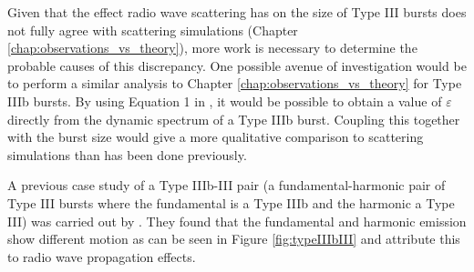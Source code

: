 %
%
Given that the effect radio wave scattering has on the size of Type III bursts does not fully agree with scattering simulations (Chapter \ref{chap:observations_vs_theory}), more work is necessary to determine the probable causes of this discrepancy. One possible avenue of investigation would be to perform a similar analysis to Chapter \ref{chap:observations_vs_theory} for Type IIIb bursts. By using Equation 1 in \cite{Reid2021}, it would be possible to obtain a value of $\varepsilon$ directly from the dynamic spectrum of a Type IIIb burst. Coupling this together with the burst size would give a more qualitative comparison to scattering simulations than has been done previously.

A previous case study of a Type IIIb-III pair (a fundamental-harmonic pair of Type III bursts where the fundamental is a Type IIIb and the harmonic a Type III) was carried out by \cite{Zhang2020}. They found that the fundamental and harmonic emission show different motion as can be seen in Figure \ref{fig:typeIIIbIII} and attribute this to radio wave propagation effects.

